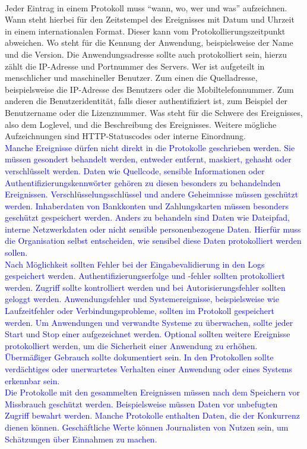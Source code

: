 \\
Jeder Eintrag in einem Protokoll muss \enquote{wann, wo, wer und was} aufzeichnen.
Wann steht hierbei für den Zeitstempel des Ereignisses mit Datum und Uhrzeit in einem internationalen Format.
Dieser kann vom Protokollierungszeitpunkt abweichen.
Wo steht für die Kennung der Anwendung, beispielsweise der Name und die Version.
Die Anwendungsadresse sollte auch protokolliert sein, hierzu zählt die IP-Adresse und Portnummer des Servers.
Wer ist aufgeteilt in menschlicher und maschineller Benutzer.
Zum einen die Quelladresse, beispielsweise die IP-Adresse des Benutzers oder die Mobiltelefonnummer.
Zum anderen die Benutzeridentität, falls dieser authentifiziert ist, zum Beispiel der Benutzername oder die Lizenznummer.
Was steht für die Schwere des Ereignisses, also dem Loglevel, und die Beschreibung des Ereignisses.
Weitere mögliche Aufzeichnungen sind HTTP-Statuscodes oder interne Einordnung.
\\
\textcolor{blue}{
    Manche Ereignisse dürfen nicht direkt in die Protokolle geschrieben werden.
    Sie müssen gesondert behandelt werden, entweder entfernt, maskiert, gehasht oder verschlüsselt werden.
    Daten wie Quellcode, sensible Informationen oder Authentifizierungskennwörter gehören zu diesen besonders zu behandelnden Ereignissen.
    Verschlüsselungsschlüssel und andere Geheimnisse müssen geschützt werden.
    Inhaberdaten von Bankkonten und Zahlungskarten müssen besonders geschützt gespeichert werden.
    Anders zu behandeln sind Daten wie Dateipfad, interne Netzwerkdaten oder nicht sensible personenbezogene Daten.
    Hierfür muss die Organisation selbst entscheiden, wie sensibel diese Daten protokolliert werden sollen.
    \\
    Nach Möglichkeit sollten Fehler bei der Eingabevalidierung in den Logs gespeichert werden.
    Authentifizierungserfolge und -fehler sollten protokolliert werden.
    Zugriff sollte kontrolliert werden und bei Autorisierungsfehler sollten geloggt werden.
    Anwendungsfehler und Systemereignisse, beispielsweise wie Laufzeitfehler oder Verbindungsprobleme, sollten im Protokoll gespeichert werden.
    Um Anwendungen und verwandte Systeme zu überwachen, sollte jeder Start und Stop einer aufgezeichnet werden.
    Optional sollten weitere Ereignisse protokolliert werden, um die Sicherheit einer Anwendung zu erhöhen.
    Übermäßiger Gebrauch sollte dokumentiert sein.
    In den Protokollen sollte verdächtiges oder unerwartetes Verhalten einer Anwendung oder eines Systems erkennbar sein.
    \\
    Die Protokolle mit den gesammelten Ereignissen müssen nach dem Speichern vor Missbrauch geschützt werden.
    Beispielsweise müssen Daten vor unbefugten Zugriff bewahrt werden.
    Manche Protokolle enthalten Daten, die der Konkurrenz dienen können.
    Geschäftliche Werte können Journalisten von Nutzen sein, um Schätzungen über Einnahmen zu machen.
}\autocite{ip-insider, ait, owasp}


